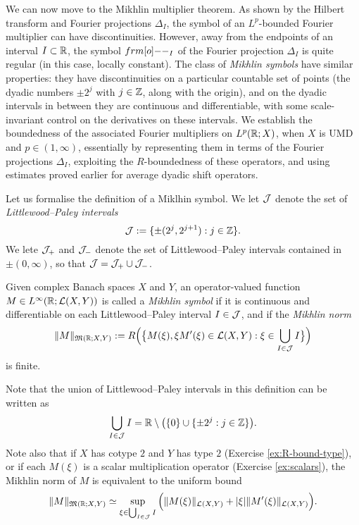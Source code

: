 We can now move to the Mikhlin multiplier theorem.
As shown by the Hilbert transform and Fourier projections $\Delta_{I}$, the symbol of an $L^p$-bounded Fourier multiplier can have discontinuities.
However, away from the endpoints of an interval $I \subset \mathbb{R}$, the symbol $\1_{I}$ of the Fourier projection $\Delta_{I}$ is quite regular (in this case, locally constant).
The class of \emph{Mikhlin symbols} have similar properties: they have discontinuities on a particular countable set of points (the dyadic numbers $\pm 2^{j}$ with $j \in \mathbb{Z}$, along with the origin), and on the dyadic intervals in between they are continuous and differentiable, with some scale-invariant control on the derivatives on these intervals.
We establish the boundedness of the associated Fourier multipliers on $L^p(\mathbb{R};X)$, when $X$ is UMD and $p \in (1,\infty)$, essentially by representing them in terms of the Fourier projections $\Delta_{I}$, exploiting the $R$-boundedness of these operators, and using estimates proved earlier for average dyadic shift operators.

Let us formalise the definition of a Miklhin symbol.
We let $\mathcal{J}$ denote the set of \emph{Littlewood--Paley intervals}
\begin{equation*}
  \mathcal{J} := \{\pm(2^{j}, 2^{j+1}) : j \in \mathbb{Z}\}.
\end{equation*}
We lete $\mathcal{J}_{+}$ and $\mathcal{J}_{-}$ denote the set of Littlewood--Paley intervals contained in $\pm(0,\infty)$, so that $\mathcal{J} = \mathcal{J}_{+} \cup \mathcal{J}_{-}$.

\begin{defn}
  Given complex Banach spaces $X$ and $Y$, an operator-valued function $M \in L^\infty(\mathbb{R}; \mathcal{L}(X,Y))$ is called a \emph{Mikhlin symbol} if it is continuous and differentiable on each Littlewood--Paley interval $I \in \mathcal{J}$, and if the \emph{Mikhlin norm}
  \begin{equation*}
    \|M\|_{\mathfrak{M}(\mathbb{R};X,Y)} := R \Big( \big\{ M(\xi), \xi M'(\xi) \in \mathcal{L}(X,Y) : \xi \in \bigcup_{I \in \mathcal{J}} I \big\} \Big)
  \end{equation*}
  is finite.
\end{defn}

Note that the union of Littlewood--Paley intervals in this definition can be written as
\begin{equation*}
  \bigcup_{I \in \mathcal{J}} I = \mathbb{R} \setminus \big( \{0\} \cup \{\pm 2^{j} : j \in \mathbb{Z}\} \big).
\end{equation*}
Note also that if $X$ has cotype $2$ and $Y$ has type $2$ (Exercise \ref{ex:R-bound-type}), or if each $M(\xi)$ is a scalar multiplication operator (Exercise \ref{ex:scalars}), the Mikhlin norm of $M$ is equivalent to the uniform bound
\begin{equation*}
  \|M\|_{\mathfrak{M}(\mathbb{R};X,Y)} \simeq \sup_{\xi \in \bigcup_{I \in \mathcal{J}} I} \Big( \|M(\xi)\|_{\mathcal{L}(X,Y)} + |\xi|\|M'(\xi)\|_{\mathcal{L}(X,Y)} \Big).
\end{equation*}

